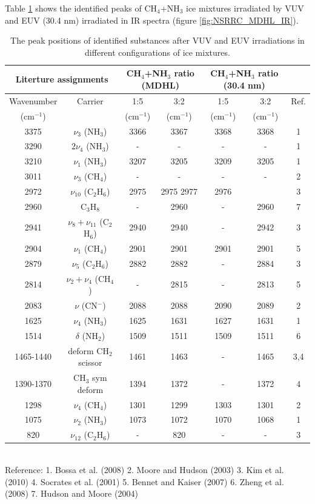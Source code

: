 Table \ref{tab:WavenumberNSRRC} shows the identified peaks of CH$_4$+NH$_3$ ice mixtures irradiated by VUV and EUV (30.4 nm) irradiated in IR spectra (figure \ref{fig:NSRRC_MDHL_IR}).

\begin{table}[htbp]
\caption{The peak positions of identified substances after VUV and EUV irradiations in different configurations of ice mixtures.}
\label{tab:WavenumberNSRRC}
\begin{tabular}{ccccccc}
\hline
\hline
\multicolumn{2}{c}{Literture assignments} & \multicolumn{2}{c}{CH$_4$+NH$_3$ ratio (MDHL)} & \multicolumn{2}{c}{CH$_4$+NH$_3$ ratio (30.4 nm)} \\
\hline
Wavenumber & Carrier  & 1:5 & 3:2 & 1:5 & 3:2 & Ref. \\
(cm$^{-1}$) &   & (cm$^{-1}$) & (cm$^{-1}$) & (cm$^{-1}$) & (cm$^{-1}$) &\\
\hline
3375 & $\nu_3$ (NH$_3$) & 3366 & 3367 & 3368 & 3368 & 1 \\
3290 & $2\nu_4$ (NH$_3$) & - & - & - & - & 1 \\
3210 & $\nu_1$ (NH$_3$) & 3207 & 3205 & 3209 & 3205 &1 \\
3011 & $\nu_3$ (CH$_4$) & - & - & - & - & 2 \\
2972 & $\nu_{10}$ (C$_2$H$_6$) & 2975 & 2975 2977 & 2976 & & 3 \\
2960 & C$_3$H$_8$ & - & 2960 & - & 2960 & 7 \\
2941 & $\nu_8+\nu_11$ (C$_2$H$_6$) & 2940 & 2940 & - & 2942 & 3 \\
2904 & $\nu_1$ (CH$_4$) & 2901 & 2901 & 2901 & 2901 & 5 \\
2879 & $\nu_5$ (C$_2$H$_6$) & 2882 & 2882 & - & 2884&  3 \\
2814 & $\nu_2+\nu_4$ (CH$_4$) & - & 2815 & - & 2813 & 5 \\
2083 & $\nu$ (CN$^-$) & 2088  & 2088 & 2090 & 2089 & 2 \\
1625 & $\nu_4$ (NH$_3$) & 1625 & 1631 & 1627 & 1631 & 1 \\
1514 & $\delta$ (NH$_2$) & 1509 & 1511 & 1509 & 1511 & 6 \\
1465-1440 & deform CH$_2$ scissor & 1461 & 1463 & - & 1465 & 3,4 \\
1390-1370 & CH$_3$ sym deform & 1394 & 1372 & - & 1372 & 4 \\
1298 & $\nu_4$ (CH$_4$) & 1301 & 1299 & 1303 & 1301 & 2 \\
1075 & $\nu_2$ (NH$_3$) & 1073 & 1072 & 1070 & 1068 & 1 \\
820 & $\nu_12$ (C$_2$H$_6$) & - & 820 & - & - & 3 \\
\hline
\end{tabular}\\
Reference: 1. Bossa et al. (2008) \cite{bossa2008carbamic} 2. Moore and Hudson (2003) \cite{moore2003infrared} 3. Kim et al. (2010) \cite{kim2010abiotic} 4. Socrates et al. (2001) \cite{socrates2001infrared} 5. Bennet and Kaiser (2007) \cite{bennett2007formation} 6. Zheng et al. (2008) \cite{zheng2008formation} 7. Hudson and Moore (2004) \cite{hudson2004reactions}
\end{table}


